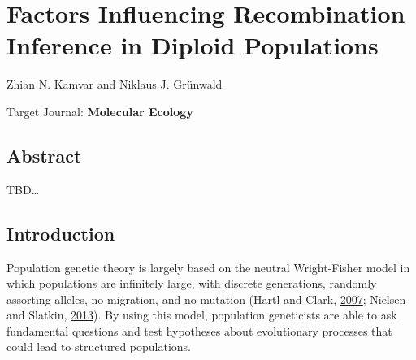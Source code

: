 \documentclass[double,12pt]{beavtex}
\begin{document}
  \chapter{Factors Influencing Recombination Inference in Diploid
  Populations}\label{factors-influencing-recombination-inference-in-diploid-populations}
  
  \singlespacing
  
  \begin{center}
  
  
  Zhian N. Kamvar and Niklaus J. Grünwald
  
  
  
  \end{center}\vspace*{\fill}
  
  Target Journal: \textbf{Molecular Ecology}
  
  \doublespacing
  \newpage
  
  \section{Abstract}\label{abstract-3}
  
  TBD\ldots{}
  
  \section{Introduction}\label{introduction-4}
  
  Population genetic theory is largely based on the neutral Wright-Fisher
  model in which populations are infinitely large, with discrete
  generations, randomly assorting alleles, no migration, and no mutation
  (Hartl and Clark, \protect\hyperlink{ref-hartl1997principles}{2007};
  Nielsen and Slatkin,
  \protect\hyperlink{ref-nielsen2013introduction}{2013}). By using this
  model, population geneticists are able to ask fundamental questions and
  test hypotheses about evolutionary processes that could lead to
  structured populations.
  
\end{document}

